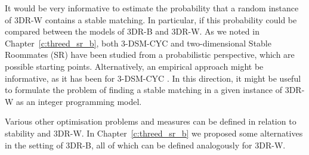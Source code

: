 It would be very informative to estimate the probability that a random instance of 3DR-W contains a stable matching. In particular, if this probability could be compared between the models of 3DR-B and 3DR-W. As we noted in Chapter~\ref{c:threed_sr_b}, both 3-DSM-CYC \cite{Pittel20} and two-dimensional Stable Roommates (SR) \cite{PI94} have been studied from a probabilistic perspective, which are possible starting points. Alternatively, an empirical approach might be informative, as it has been for 3-DSM-CYC \cite{Escamocher2018}. In this direction, it might be useful to formulate the problem of finding a stable matching in a given instance of 3DR-W as an integer programming model.

Various other optimisation problems and measures can be defined in relation to stability and 3DR-W. In Chapter~\ref{c:threed_sr_b} we proposed some alternatives in the setting of 3DR-B, all of which can be defined analogously for 3DR-W.